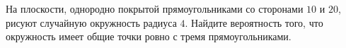 \documentclass{article}
\begin{document}
На плоскости, однородно покрытой прямоугольниками со сторонами $10$ и $20$,
рисуют случайную окружность радиуса $4$. Найдите вероятность того, что окружность имеет общие точки ровно с тремя прямоугольниками.
\end{document}

